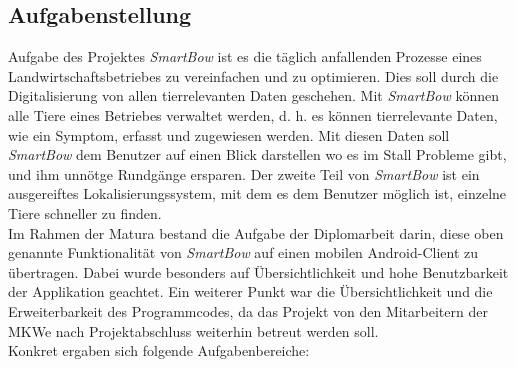 \subsection{Aufgabenstellung}
Aufgabe des Projektes \textit{SmartBow} ist es die täglich anfallenden Prozesse eines Landwirtschaftsbetriebes zu vereinfachen und zu optimieren. Dies soll durch die Digitalisierung von allen tierrelevanten Daten geschehen. Mit \textit{SmartBow} können alle Tiere eines Betriebes verwaltet werden, d. h. es können tierrelevante Daten, wie ein Symptom, erfasst und zugewiesen werden. Mit diesen Daten soll \textit{SmartBow} dem Benutzer auf einen Blick darstellen wo es im Stall Probleme gibt, und ihm unnötge Rundgänge ersparen. Der zweite Teil von \textit{SmartBow} ist ein ausgereiftes Lokalisierungssystem, mit dem es dem Benutzer möglich ist, einzelne Tiere schneller zu finden.
\\[0.5em]
Im Rahmen der Matura bestand die Aufgabe der Diplomarbeit darin, diese oben genannte Funktionalität von \textit{SmartBow} auf einen mobilen Android-Client zu übertragen. Dabei wurde besonders auf Übersichtlichkeit und hohe Benutzbarkeit der Applikation geachtet. Ein weiterer Punkt war die Übersichtlichkeit und die Erweiterbarkeit des Programmcodes, da das Projekt von den Mitarbeitern der MKWe nach Projektabschluss weiterhin betreut werden soll.
\\[0.5em]
Konkret ergaben sich folgende Aufgabenbereiche:
